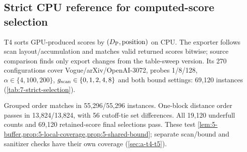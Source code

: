 \subsection{Strict CPU reference for computed-score selection}
\label{sec:7-strict-selection}

T4 sorts GPU-produced scores by $(D_{\mathrm{P}},\mathrm{position})$ on CPU. The exporter follows scan layout/accumulation and matches valid returned scores bitwise; source comparison finds only export changes from the table-sweep version. Its 270 configurations cover Vogue/arXiv/OpenAI-3072, probes 1/8/128, $\alpha\in\{4,100,200\}$, $g_{\mathrm{scan}}\in\{0,1,2,4,8\}$ and both bound settings: 69,120 instances (\cref{tab:7-strict-selection}).

\suppressfloats[t]
\begin{table}[htbp]
\centering
\caption[Strict computed-score selection checks]{T4 CPU-reference checks.
Set and order equality use the complete primary key. Valid count checks
$\min(c,n_c)$ survivors; final equality sorts retained computed refined
scores by $(\refineddist,\mathrm{ID})$, including their FP32 bits. Counts
are query instances, with queries reused across configurations.}
\label{tab:7-strict-selection}
\footnotesize\setlength{\tabcolsep}{3pt}

\end{table}

Grouped order matches in 55,296/55,296 instances. One-block distance order passes in 13,824/13,824, with 56 cutoff-tie set differences. All 19,120 underfull counts and 69,120 retained-score final selections pass. These test \cref{lem:5-buffer,prop:5-local-coverage,prop:5-shared-bound}; separate scan/bound and sanitizer checks have their own coverage (\cref{sec:a-t4-t5}).